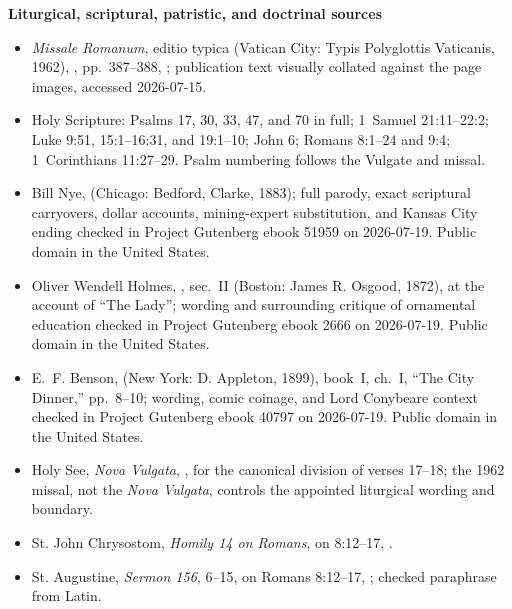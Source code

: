 \textbf{Liturgical, scriptural, patristic, and doctrinal sources}
{\fontsize{8.0}{8.8}\selectfont
\begin{itemize}[itemsep=0em,topsep=0.15em,parsep=0pt]
\item \emph{Missale Romanum}, editio typica (Vatican City: Typis Polyglottis Vaticanis, 1962), , pp.~387--388, ; publication text visually collated against the page images, accessed 2026-07-15.
\item Holy Scripture: Psalms 17, 30, 33, 47, and 70 in full; 1~Samuel 21:11--22:2; Luke 9:51, 15:1--16:31, and 19:1--10; John 6; Romans 8:1--24 and 9:4; 1~Corinthians 11:27--29. Psalm numbering follows the Vulgate and missal.
\item Bill Nye,  (Chicago: Bedford, Clarke, 1883); full parody, exact scriptural carryovers, dollar accounts, mining-expert substitution, and Kansas City ending checked in Project Gutenberg ebook 51959 on 2026-07-19. Public domain in the United States.
\item Oliver Wendell Holmes, , sec.~II (Boston: James R. Osgood, 1872), at the account of ``The Lady''; wording and surrounding critique of ornamental education checked in Project Gutenberg ebook 2666 on 2026-07-19. Public domain in the United States.
\item E.~F. Benson,  (New York: D. Appleton, 1899), book~I, ch.~I, ``The City Dinner,'' pp.~8--10; wording, comic coinage, and Lord Conybeare context checked in Project Gutenberg ebook 40797 on 2026-07-19. Public domain in the United States.
\item Holy See, \emph{Nova Vulgata}, , for the canonical division of verses 17--18; the 1962 missal, not the \emph{Nova Vulgata}, controls the appointed liturgical wording and boundary.
\item St. John Chrysostom, \emph{Homily 14 on Romans}, on 8:12--17, .
\item St. Augustine, \emph{Sermon 156}, 6--15, on Romans 8:12--17, ; checked paraphrase from Latin.

\end{itemize}}
